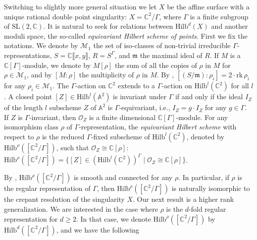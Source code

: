 \documentclass{amsart}[12pt]
\theoremstyle{definition}
\theoremstyle{remark}
\numberwithin{equation}{section}
\begin{document}
Switching to slightly more general situation we let $X$ be the affine surface with a unique rational double point singularity: $X = \mathbb{C}^2/\Gamma$, where $\Gamma$ is a finite subgroup of $\mathrm{SL}(2, \mathbb{C})$. It is natural to seek for relations between $\mathrm{Hilb}^d(X)$ and another moduli space, the so-called \textit{equivariant Hilbert scheme of points}. First we fix the notations. We denote by $\mathcal{M}_1$ the set of iso-classes of non-trivial irreducible $\Gamma$-representations, $S = \mathbb{C}\llbracket x, y \rrbracket$, $R = S^{\Gamma}$, and $\mathfrak{m}$ the maximal ideal of $R$. If $M$ is a $\mathbb{C}[\Gamma]$-module, we denote by $M[\rho]$ the sum of all the copies of $\rho$ in $M$ for $\rho \in \mathcal{M}_1$, and by $[M : \rho]$ the multiplicity of $\rho$ in $M$. By \cite[Theorem 10.5.1]{IN99}, $[(S / \mathfrak{m}):  \rho_i] =  2\cdot \mathrm{rk}\, \rho_i$ for any $\rho_i \in \mathcal{M}_1$. The $\Gamma$-action on $\mathbb{C}^2$ extends to a $\Gamma$-action on $\mathrm{Hilb}^{l}(\mathbb{C}^2)$ for all $l$. A closed point $[Z] \in \mathrm{Hilb}^{l}(\mathbb{A}^2)$ is invariant under $\Gamma$ if and only if the ideal $I_Z$ of the length $l$ subscheme $Z$ of $\mathbb{A}^2$ is $\Gamma$-equivariant, i.e., $I_Z = g \cdot I_Z$ for any $g \in \Gamma$. If $Z$ is $\Gamma$-invariant, then $\mathcal{O}_Z$ is a finite dimensional $\mathbb{C}[\Gamma]$-module. For any isomorphism class $\rho$ of $\Gamma$-representation, the \textit{equivariant Hilbert scheme} with respect to $\rho$ is the reduced $\Gamma$-fixed subscheme of $\mathrm{Hilb}^{l}(\mathbb{C}^2)$, denoted by $\mathrm{Hilb}^{\rho}([\mathbb{C}^2/\Gamma])$, such that $\mathcal{O}_Z \cong \mathbb{C}[\rho]$: $\mathrm{Hilb}^{\rho}([\mathbb{C}^2/\Gamma]) = \{[Z] \in (\mathrm{Hilb}^{l}(\mathbb{C}^2))^{\Gamma} \mid \mathcal{O}_Z \cong \mathbb{C}[\rho]\}$. 

By \cite[Remarks added in April 2000]{CB01}, $\mathrm{Hilb}^{\rho}([\mathbb{C}^2/\Gamma])$ is smooth and connected for any $\rho$. In particular, if $\rho$ is the regular representation of $\Gamma$, then $\mathrm{Hilb}^{\rho}([\mathbb{C}^2/\Gamma])$ is naturally isomorphic to the crepant resolution of the singularity $X$. Our next result is a higher rank generalization.  We are interested in the case where $\rho$ is the $d$-fold regular representation for $d \geq 2$. In that case, we denote $\mathrm{Hilb}^{\rho}([\mathbb{C}^2/\Gamma])$ by $\mathrm{Hilb}^{d}([\mathbb{C}^2/\Gamma])$, and we have the following
\end{document}
